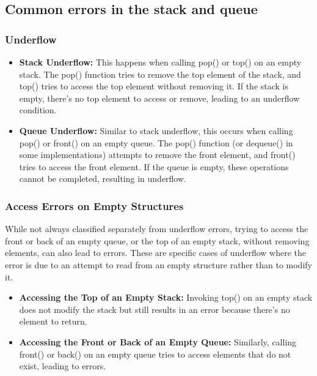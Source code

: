 \documentclass{report}
\begin{document}
     \bigbreak \noindent 
     \subsection{Common errors in the stack and queue}
     \bigbreak \noindent 
     \subsubsection{Underflow}
     \begin{itemize}
         \item \textbf{Stack Underflow:} This happens when calling pop() or top() on an empty stack. The pop() function tries to remove the top element of the stack, and top() tries to access the top element without removing it. If the stack is empty, there's no top element to access or remove, leading to an underflow condition.
         \item \textbf{Queue Underflow:} Similar to stack underflow, this occurs when calling pop() or front() on an empty queue. The pop() function (or dequeue() in some implementations) attempts to remove the front element, and front() tries to access the front element. If the queue is empty, these operations cannot be completed, resulting in underflow.
     \end{itemize}
     \bigbreak \noindent 

     \bigbreak \noindent 
     \subsubsection{Access Errors on Empty Structures}
     \bigbreak \noindent 
     While not always classified separately from underflow errors, trying to access the front or back of an empty queue, or the top of an empty stack, without removing elements, can also lead to errors. These are specific cases of underflow where the error is due to an attempt to read from an empty structure rather than to modify it.
     \begin{itemize}
         \item \textbf{Accessing the Top of an Empty Stack:} Invoking top() on an empty stack does not modify the stack but still results in an error because there's no element to return.
         \item \textbf{Accessing the Front or Back of an Empty Queue:} Similarly, calling front() or back() on an empty queue tries to access elements that do not exist, leading to errors.        
     \end{itemize}













    
\end{document}
